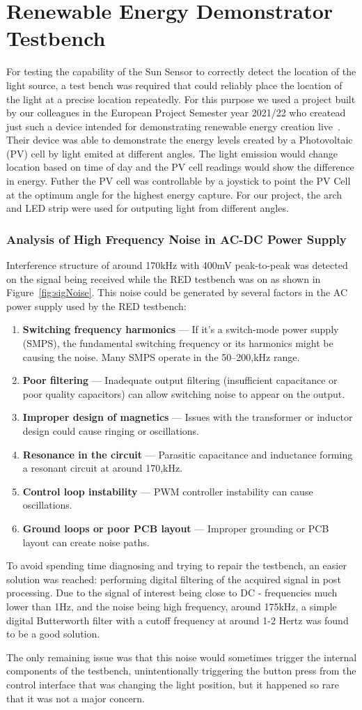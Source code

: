 \section{Renewable Energy Demonstrator Testbench}
For testing the capability of the Sun Sensor to correctly detect the location of the light source, a test bench was required that could reliably place the location of the light at a precise location repeatedly. For this purpose we used a project built by our colleagues in the European Project Semester year 2021/22 who createad just such a device intended for demonstrating renewable energy creation live~\cite{RefWorks:shopov2022renewable}. Their device was able to demonstrate the energy levels created by a Photovoltaic (PV) cell by light emited at different angles. The light emission would change location based on time of day and the PV cell readings would show the difference in energy. Futher the PV cell was controllable by a joystick to point the PV Cell at the optimum angle for the highest energy capture. For our project, the arch and LED strip were used for outputing light from different angles.
\subsubsection*{Analysis of High Frequency Noise in AC-DC Power Supply}
Interference structure of around 170kHz with 400mV peak-to-peak was detected on the signal being received while the RED testbench was on as shown in Figure~\ref{fig:sigNoise}. This noise could be generated by several factors in the AC power supply used by the RED testbench:
\begin{enumerate}[label=\arabic*.]
\item \textbf{Switching frequency harmonics} --- If it's a switch-mode power supply (SMPS), the fundamental switching frequency or its harmonics might be causing the noise. Many SMPS operate in the 50--200,kHz range.
\item \textbf{Poor filtering} --- Inadequate output filtering (insufficient capacitance or poor quality capacitors) can allow switching noise to appear on the output.
\item \textbf{Improper design of magnetics} --- Issues with the transformer or inductor design could cause ringing or oscillations.
\item \textbf{Resonance in the circuit} --- Parasitic capacitance and inductance forming a resonant circuit at around 170,kHz.
\item \textbf{Control loop instability} --- PWM controller instability can cause oscillations.
\item \textbf{Ground loops or poor PCB layout} --- Improper grounding or PCB layout can create noise paths.~\cite{RefWorks:giuliattini2006prediction}
\end{enumerate}
To avoid spending time diagnosing and trying to repair the testbench, an easier solution was reached: performing digital filtering of the acquired signal in post processing. Due to the signal of interest being close to DC - frequencies much lower than 1Hz, and the noise being high frequency, around 175kHz, a simple digital Butterworth filter with a cutoff frequency at around 1-2 Hertz was found to be a good solution.

The only remaining issue was that this noise would sometimes trigger the internal components of the testbench, unintentionally triggering the button press from the control interface that was changing the light position, but it happened so rare that it was not a major concern.